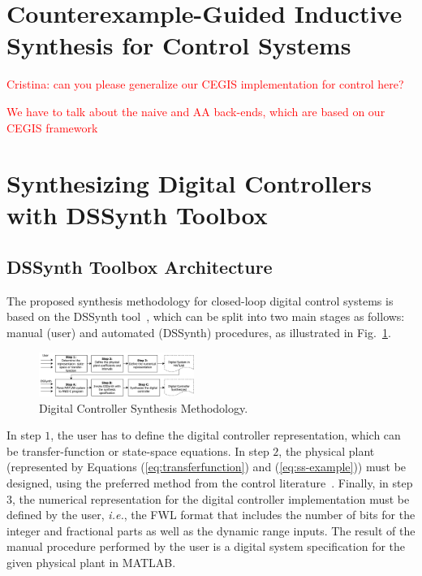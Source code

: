 \documentclass[sigconf]{acmart}
\newcommand\tool{{DSSynth Toolbox}\xspace}
\begin{document}
\section{Counterexample-Guided Inductive Synthesis for Control Systems}

\textcolor{red}{Cristina: can you please generalize our CEGIS implementation for control here?}

\textcolor{red}{We have to talk about the naive and AA back-ends, which are based on our CEGIS framework}

\section{Synthesizing Digital Controllers with \tool}

\subsection{\tool Architecture}

The proposed synthesis methodology for closed-loop digital control
systems is based on the DSSynth tool~\cite{abate2017, abatecav2017}, 
which can be split into two main stages as follows: manual (user) and 
automated (DSSynth) procedures, as illustrated in Fig.~\ref{fig:synthesis-flow}. 
%
\begin{figure}[ht!]
\centering
\includegraphics[width=0.45\textwidth]{synthesis-flow.pdf}
\caption{Digital Controller Synthesis Methodology.}
\label{fig:synthesis-flow}
\end{figure}

In step $1$, the user has to define the digital controller representation, 
which can be transfer-function or state-space equations. 
In step $2$, the physical plant (represented by Equations (\ref{eq:transferfunction}) 
and (\ref{eq:ss-example})) must be designed, using the preferred method 
from the control literature~\cite{astrom1997computer}. Finally, in step $3$, 
the numerical representation for the digital controller implementation must be 
defined by the user, {\it i.e.}, the FWL format that includes the number of bits for the integer 
and fractional parts as well as the dynamic range inputs. The result of the manual 
procedure performed by the user is a digital system specification for the given 
physical plant in MATLAB. 
\end{document}
